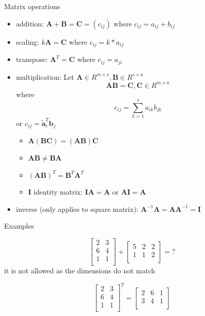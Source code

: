 \documentclass[ignorenonframetext,]{beamer}
\providecommand{\tightlist}{%
  \setlength{\itemsep}{0pt}\setlength{\parskip}{0pt}}
\newcommand{\vv}[1]{\boldsymbol{#1}}
\begin{document}
\begin{frame}{Matrix operations}
\protect\hypertarget{matrix-operations}{}

\begin{itemize}
\tightlist
\item
  addition: \(\vv{A} +\vv{B} =\vv{C}=(c_{ij})\) where
  \(c_{ij} = a_{ij} +b_{ij}\)
\item
  scaling: \(k\vv{A}= \vv{C}\) where \(c_{ij} =k* a_{ij}\)
\item
  transpose: \(\vv{A}^T = \vv{C}\) where \(c_{ij} = a_{ji}\)
\item
  multiplication: Let
  \(\vv{A}\in R^{m\times s}, \vv{B} \in R^{s\times n}\)
  \[\vv{AB} = \vv{C}, \vv{C} \in R^{m\times n}\] where
  \[c_{ij} = \sum_{k=1}^s a_{ik}b_{jk}\] or
  \(c_{ij} = \vv{\tilde{a}}_i^T\vv{b}_j\)

  \begin{itemize}
  \tightlist
  \item
    \(\vv{A}(\vv{BC}) =(\vv{AB})\vv{C}\)
  \item
    \(\vv{AB} \neq \vv{BA}\)
  \item
    \((\vv{AB})^T = \vv{B}^T \vv{A}^T\)
  \item
    \(\vv{I}\) identity matrix: \(\vv{I}\vv{A} = \vv{A}\) or
    \(\vv{AI}=\vv{A}\)
  \end{itemize}
\item
  inverse (only applies to square matrix):
  \(\vv{A}^{-1} \vv{A}= \vv{AA}^{-1} =\vv{I}\)
\end{itemize}

\end{frame}

\begin{frame}{Examples}
\protect\hypertarget{examples}{}

\[
\begin{bmatrix}2&3 \\6&4 \\1&1 \\\end{bmatrix} + \begin{bmatrix}5&2&2 \\1&1&2 \\\end{bmatrix}  = ?
\] \pause it is not allowed as the dimensions do not match

\[
\begin{bmatrix}2&3 \\6&4 \\1&1 \\\end{bmatrix}^T   = \begin{bmatrix}2&6&1 \\3&4&1 \\\end{bmatrix}
\]

\end{frame}
\end{document}
